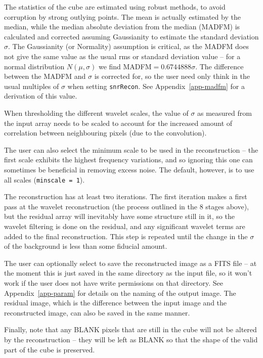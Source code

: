 \documentclass[12pt]{article}
\begin{document}
The statistics of the cube are estimated using robust methods, to
avoid corruption by strong outlying points. The mean is actually
estimated by the median, while the median absolute deviation from the
median (MADFM) is calculated and corrected assuming Gaussianity to
estimate the standard deviation $\sigma$. The Gaussianity (or
Normality) assumption is critical, as the MADFM does not give the same
value as the usual rms or standard deviation value -- for a normal
distribution $N(\mu,\sigma)$ we find MADFM$=0.6744888\sigma$. The
difference between the MADFM and $\sigma$ is corrected for, so the
user need only think in the usual multiples of $\sigma$ when setting
{\tt snrRecon}. See Appendix~\ref{app-madfm} for a derivation of this
value.

When thresholding the different wavelet scales, the value of $\sigma$
as measured from the input array needs to be scaled to account for the
increased amount of correlation between neighbouring pixels (due to
the convolution). 

The user can also select the minimum scale to be used in the
reconstruction -- the first scale exhibits the highest frequency
variations, and so ignoring this one can sometimes be beneficial in
removing excess noise. The default, however, is to use all scales
({\tt minscale = 1}).

The reconstruction has at least two iterations. The first iteration
makes a first pass at the wavelet reconstruction (the process outlined
in the 8 stages above), but the residual array will inevitably have
some structure still in it, so the wavelet filtering is done on the
residual, and any significant wavelet terms are added to the final
reconstruction. This step is repeated until the change in the $\sigma$
of the background is less than some fiducial amount.

The user can optionally select to save the reconstructed image as a
FITS file -- at the moment this is just saved in the same directory as
the input file, so it won't work if the user does not have write
permissions on that directory. See Appendix~\ref{app-param} for details
on the naming of the output image. The residual image, which is the
difference between the input image and the reconstructed image, can
also be saved in the same manner. 

Finally, note that any BLANK pixels that are still in the cube
will not be altered by the reconstruction -- they will be left as
BLANK so that the shape of the valid part of the cube is preserved.
\end{document}
